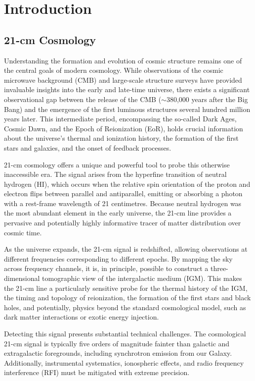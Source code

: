 \documentclass[floats,floatfix,showpacs,amssymb,prd,superscriptaddress,nofootinbib]{revtex4-2} %
\begin{document}

\newpage

{\tableofcontents}
\newpage
\section{Introduction}
\subsection{21-cm Cosmology}
Understanding the formation and evolution of cosmic structure remains one of the central goals of modern cosmology. While observations of the cosmic microwave background (CMB) and large-scale structure surveys have provided invaluable insights into the early and late-time universe, there exists a significant observational gap between the release of the CMB ($\sim$380,000 years after the Big Bang) and the emergence of the first luminous structures several hundred million years later. This intermediate period, encompassing the so-called Dark Ages, Cosmic Dawn, and the Epoch of Reionization (EoR), holds crucial information about the universe's thermal and ionization history, the formation of the first stars and galaxies, and the onset of feedback processes.

21-cm cosmology offers a unique and powerful tool to probe this otherwise inaccessible era. The signal arises from the hyperfine transition of neutral hydrogen (HI), which occurs when the relative spin orientation of the proton and electron flips between parallel and antiparallel, emitting or absorbing a photon with a rest-frame wavelength of 21 centimetres. Because neutral hydrogen was the most abundant element in the early universe, the 21-cm line provides a pervasive and potentially highly informative tracer of matter distribution over cosmic time.

As the universe expands, the 21-cm signal is redshifted, allowing observations at different frequencies corresponding to different epochs. By mapping the sky across frequency channels, it is, in principle, possible to construct a three-dimensional tomographic view of the intergalactic medium (IGM). This makes the 21-cm line a particularly sensitive probe for the thermal history of the IGM, the timing and topology of reionization, the formation of the first stars and black holes, and potentially, physics beyond the standard cosmological model, such as dark matter interactions or exotic energy injection.

Detecting this signal presents substantial technical challenges. The cosmological 21-cm signal is typically five orders of magnitude fainter than galactic and extragalactic foregrounds, including synchrotron emission from our Galaxy. Additionally, instrumental systematics, ionospheric effects, and radio frequency interference (RFI) must be mitigated with extreme precision.
\end{document}
